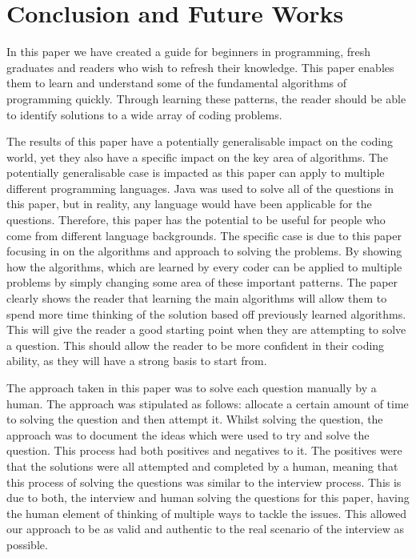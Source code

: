 \documentclass[10pt,twocolumn]{IEEEtran}
\begin{document}
\section{Conclusion and Future Works}
In this paper we have created a guide for beginners in programming, fresh graduates and readers who wish to refresh their knowledge. This paper enables them to learn and understand some of the fundamental algorithms of programming quickly. Through learning these patterns, the reader should be able to identify solutions to a wide array of coding problems. 
\par The results of this paper have a potentially generalisable impact on the coding world, yet they also have a specific impact on the key area of algorithms. The potentially generalisable case is impacted as this paper can apply to multiple different programming languages. Java was used to solve all of the questions in this paper, but in reality, any language would have been applicable for the questions. Therefore, this paper has the potential to be useful for people who come from different language backgrounds. The specific case is due to this paper focusing in on the algorithms and approach to solving the problems. By showing how the algorithms, which are learned by every coder can be applied to multiple problems by simply changing some area of these important patterns. The paper clearly shows the reader that learning the main algorithms will allow them to spend more time thinking of the solution based off previously learned algorithms. This will give the reader a good starting point when they are attempting to solve a question. This should allow the reader to be more confident in their coding ability, as they will have a strong basis to start from. 
\par The approach taken in this paper was to solve each question manually by a human. The approach was stipulated as follows: allocate a certain amount of time to solving the question and then attempt it. Whilst solving the question, the approach was to document the ideas which were used to try and solve the question.  This process had both positives and negatives to it. The positives were that the solutions were all attempted and completed by a human, meaning that this process of solving the questions was similar to the interview process. This is due to both, the interview and human solving the questions for this paper, having the human element of thinking of multiple ways to tackle the issues. This allowed our approach to be as valid and authentic to the real scenario of the interview as possible.
\end{document}
